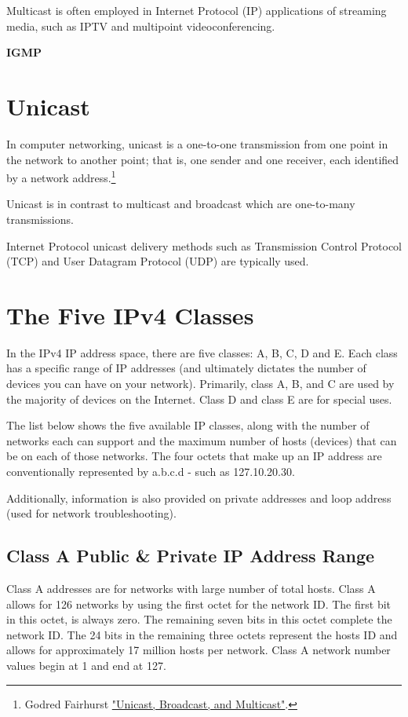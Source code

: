 \documentclass[a4paper,12pt]{article}
\begin{document}
Multicast is often employed in Internet Protocol (IP) applications of streaming media, such as IPTV and multipoint videoconferencing.

\textbf{IGMP}

\section{Unicast}
In computer networking, unicast is a one-to-one transmission from one point in the network to another point; that is, one sender and one receiver, each identified by a network address.\footnote{\label{unicast}Godred Fairhurst \href{https://www.erg.abdn.ac.uk/users/gorry/course/intro-pages/uni-b-mcast.html}{"Unicast, Broadcast, and Multicast"}.}

Unicast is in contrast to multicast and broadcast which are one-to-many transmissions.

Internet Protocol unicast delivery methods such as Transmission Control Protocol (TCP) and User Datagram Protocol (UDP) are typically used.

\section{The Five IPv4 Classes}
In the IPv4 IP address space, there are five classes: A, B, C, D and E. Each class has a specific range of IP addresses (and ultimately dictates the number of devices you can have on your network). Primarily, class A, B, and C are used by the majority of devices on the Internet. Class D and class E are for special uses.

The list below shows the five available IP classes, along with the number of networks each can support and the maximum number of hosts (devices) that can be on each of those networks. The four octets that make up an IP address are conventionally represented by a.b.c.d - such as 127.10.20.30.

Additionally, information is also provided on private addresses and loop address (used for network troubleshooting).

\subsection{Class A Public & Private IP Address Range}
Class A addresses are for networks with large number of total hosts. Class A allows for 126 networks by using the first octet for the network ID. The first bit in this octet, is always zero. The remaining seven bits in this octet complete the network ID. The 24 bits in the remaining three octets represent the hosts ID and allows for approximately 17 million hosts per network. Class A network number values begin at 1 and end at 127.
\end{document}
